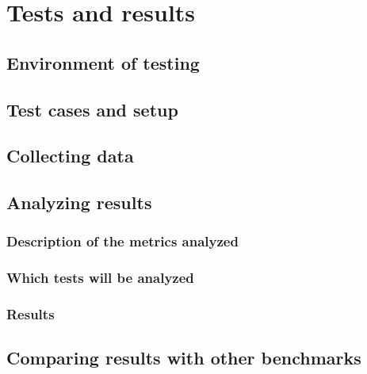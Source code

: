 \chapter{Tests and results}
\label{cha:4}

\section{Environment of testing}
\label{sec:1}

\section{Test cases and setup}
\label{sec:2}

\section{Collecting data}
\label{sec:3}

\section{Analyzing results}
\label{sec:4}

\subsection{Description of the metrics analyzed}

\subsection{Which tests will be analyzed}

\subsection{Results}

\section{Comparing results with other benchmarks}
\label{sec:5}